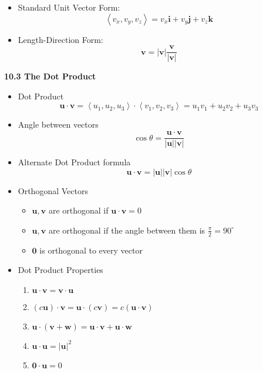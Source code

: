 \documentclass[12pt]{article}
\renewcommand{\vec}[1]{\mathbf{#1}}
\newcommand{\veci}{\mathbf{i}}
\newcommand{\vecj}{\mathbf{j}}
\newcommand{\veck}{\mathbf{k}}
\newcommand{\<}{\left<}
\renewcommand{\>}{\right>}
\begin{document}
\begin{itemize}
\begin{itemize}
\begin{itemize}
    \item Standard Unit Vector Form:
      \[\<v_x,v_y,v_z\> = v_x\veci + v_y\vecj + v_z\veck\]

    \item Length-Direction Form:
      \[\vec{v} = |\vec{v}|\frac{\vec{v}}{|\vec{v}|}\]

    \end{itemize}
  \end{itemize}
\end{itemize}

\newpage
  
\centerline{\bf 10.3 The Dot Product}
  
    \begin{itemize}
    \item Dot Product
      \[ \vec{u} \cdot \vec{v} = \<u_1,u_2,u_3\>\cdot\<v_1,v_2,v_3\> = u_1v_1 + u_2v_2 + u_3v_3 \]
  
    \item Angle between vectors
      \[\cos\theta = \frac{\vec{u}\cdot\vec{v}}{|\vec{u}||\vec{v}|}\] 
      
    \item Alternate Dot Product formula
      \[\vec{u} \cdot \vec{v} = |\vec{u}||\vec{v}|\cos \theta \]
      
    \item Orthogonal Vectors
      \begin{itemize}
      \item  $\vec{u},\vec{v}$ are orthogonal if $\vec{u} \cdot \vec{v} = 0$
      \item $\vec{u},\vec{v}$ are orthogonal if the angle between them is $\frac{\pi}{2} = 90^\circ$
      \item $\vec{0}$ is orthogonal to every vector
      \end{itemize}
    
    \item Dot Product Properties
      \begin{enumerate}
      \item $\vec{u} \cdot \vec{v} = \vec{v}\cdot\vec{u}$
      \item $(c\vec{u})\cdot \vec{v} = \vec{u} \cdot (c\vec{v}) = c(\vec{u} \cdot \vec{v})$
      \item $\vec{u} \cdot (\vec{v} + \vec{w}) = \vec{u}\cdot\vec{v} + \vec{u}\cdot \vec{w}$
      \item $\vec{u} \cdot \vec{u} = |\vec{u}|^2$
      \item $\vec{0} \cdot \vec{u} = 0$
      \end{enumerate}
    

\end{itemize}
\end{document}
